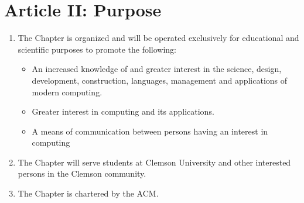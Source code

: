 \section*{Article II: Purpose}

\begin{enumerate}
    \item The Chapter is organized and will be operated exclusively for educational and scientific purposes to promote the following:
    \begin{itemize}
        \item An increased knowledge of and greater interest in the science, design, development, construction, languages, management and applications of modern computing.
        \item Greater interest in computing and its applications.
        \item A means of communication between persons having an interest in computing
    \end{itemize}
    \item The Chapter will serve students at Clemson University and other interested persons in the Clemson community.
    \item The Chapter is chartered by the ACM.
\end{enumerate}
